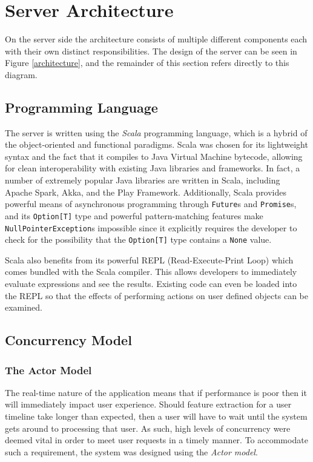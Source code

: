 \documentclass{l4proj}
\newcommand{\code}[1]{\texttt{#1}}
\begin{document}
    \section{Server Architecture}
    
On the server side the architecture consists of multiple different components each with their own distinct responsibilities. The design of the server can be seen in Figure \ref{architecture}, and the remainder of this section refers directly to this diagram.

    
    \subsection{Programming Language}
            The server is written using the \textit{Scala} programming language, which is a hybrid of the object-oriented and functional paradigms. Scala was chosen for its lightweight syntax and the fact that it compiles to Java Virtual Machine bytecode, allowing for clean interoperability with existing Java libraries and frameworks. In fact, a number of extremely popular Java libraries are written in Scala, including Apache Spark, Akka, and the Play Framework. Additionally, Scala provides powerful means of asynchronous programming through \code{Future}s and \code{Promise}s, and its \code{Option[T]} type and powerful pattern-matching features make \code{NullPointerException}s impossible since it explicitly requires the developer to check for the possibility that the \code{Option[T]} type contains a \code{None} value.
        
Scala also benefits from its powerful REPL (Read-Execute-Print Loop) which comes bundled with the Scala compiler. This allows developers to immediately evaluate expressions and see the results. Existing code can even be loaded into the REPL so that the effects of performing actions on user defined objects can be examined.

    \subsection{Concurrency Model}
    
    
    \subsubsection{The Actor Model}
The real-time nature of the application means that if performance is poor then it will immediately impact user experience. Should feature extraction for a user timeline take longer than expected, then a user will have to wait until the system gets around to processing that user. As such, high levels of concurrency were deemed vital in order to meet user requests in a timely manner. To accommodate such a requirement, the system was designed using the \textit{Actor model}.
\end{document}

